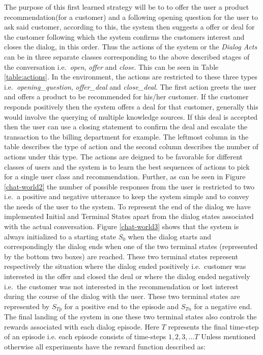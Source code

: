 \documentclass[12pt]{extarticle}
\numberwithin{equation}{section}
\begin{document}
	The purpose of this first learned strategy will be to to offer the user a product recommendation(for a customer) and a following opening question for the user to ask said customer, according to this, the system then suggests a offer or deal for the customer following which the system confirms the customers interest and closes the dialog, in this order. Thus the actions of the system or the \textit{Dialog Acts} can be in three separate classes corresponding to the above described stages of the conversation i.e.\  \textit{open}, \textit{offer} and \textit{close}. This can be seen in Table \ref{table:actions}. In the environment, the actions are restricted to these three types i.e.\ \textit{opening\_question}, \textit{offer\_deal} and \textit{close\_deal}. The first action greets the user and offers a product to be recommended for his/her customer. If the customer responds positively then the system offers a deal for that customer, generally this would involve the querying of multiple knowledge sources. If this deal is accepted then the user can use a closing statement to confirm the deal and escalate the transaction to the billing department for example. The leftmost column in the table describes the type of action and the second column describes the number of actions under this type. The actions are deigned to be favorable for different classes of users and the system is to learn the best sequences of actions to pick for a single user class and recommendation.
	Further, as can be seen in Figure \ref{chat-world2} the number of possible responses from the user is restricted to two i.e.\ a positive and negative utterance to keep the system simple and to convey the needs of the user to the system. To represent the end of the dialog we have implemented Initial and Terminal States apart from the dialog states associated with the actual conversation. Figure \ref{chat-world3} shows that the system is always initialized to a starting state $S_0$ when the dialog starts and correspondingly the dialog ends when one of the two terminal states (represented by the bottom two boxes) are reached. These two terminal states represent respectively the situation where the dialog ended positively i.e.\ customer was interested in the offer and closed the deal or where the dialog ended negatively i.e.\ the customer was not interested in the recommendation or lost interest during the course of the dialog with the user. These two terminal states are represented by $S_{Tp}$ for a positive end to the episode and $S_{Tn}$ for a negative end. The final landing of the system in one these two terminal states also controls the rewards associated with each dialog episode. Here $T$ represents the final time-step of an episode i.e. each episode consists of time-steps $1, 2, 3, \ldots T$ Unless mentioned otherwise all experiments have the reward function described as:
\end{document}
